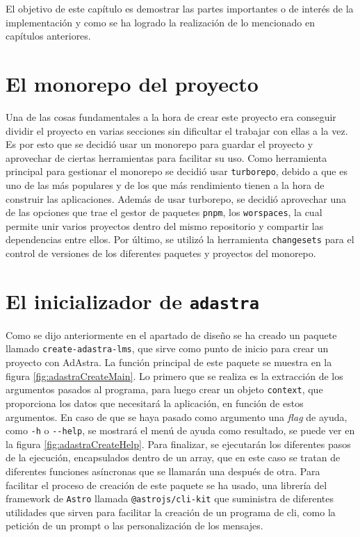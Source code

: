 El objetivo de este capítulo es demostrar las partes importantes o de interés de la implementación y como se ha logrado la realización de lo mencionado en capítulos anteriores.

\section{El monorepo del proyecto}

Una de las cosas fundamentales a la hora de crear este proyecto era conseguir dividir el proyecto en varias secciones sin dificultar el trabajar con ellas a la vez. Es por esto que se decidió usar un monorepo para guardar el proyecto y aprovechar de ciertas herramientas para facilitar su uso. Como herramienta principal para gestionar el monorepo se decidió usar \verb|turborepo|\cite{turborepo}, debido a que es uno de las más populares y de los que más rendimiento tienen a la hora de construir las aplicaciones. Además de usar turborepo, se decidió aprovechar una de las opciones que trae el gestor de paquetes \verb|pnpm|\cite{pnpm}, los \verb|worspaces|\cite{pnpm-workspaces}, la cual permite unir varios proyectos dentro del mismo repositorio y compartir las dependencias entre ellos. Por último, se utilizó la herramienta \verb|changesets|\cite{changesets} para el control de versiones de los diferentes paquetes y proyectos del monorepo.

\section{El inicializador de {\tt adastra}}

Como se dijo anteriormente en el apartado de diseño se ha creado un paquete llamado \verb|create-adastra-lms|, que sirve como punto de inicio para crear un proyecto con AdAstra. La función principal de este paquete se muestra en la figura \ref{fig:adastraCreateMain}. Lo primero que se realiza es la extracción de los argumentos pasados al programa, para luego crear un objeto \verb|context|, que proporciona los datos que necesitará la aplicación, en función de estos argumentos. En caso de que se haya pasado como argumento una \textit{flag} de ayuda, como \verb|-h| o \verb|--help|, se mostrará el menú de ayuda como resultado, se puede ver en la figura \ref{fig:adastraCreateHelp}. Para finalizar, se ejecutarán los diferentes pasos de la ejecución, encapsulados dentro de un array, que en este caso se tratan de diferentes funciones asíncronas que se llamarán una después de otra. Para facilitar el proceso de creación de este paquete se ha usado, una librería del framework de \verb|Astro|\cite{astro} llamada \verb|@astrojs/cli-kit|\cite{astro-cli} que suministra de diferentes utilidades que sirven para facilitar la creación de un programa de cli, como la petición de un prompt o las personalización de los mensajes. 


